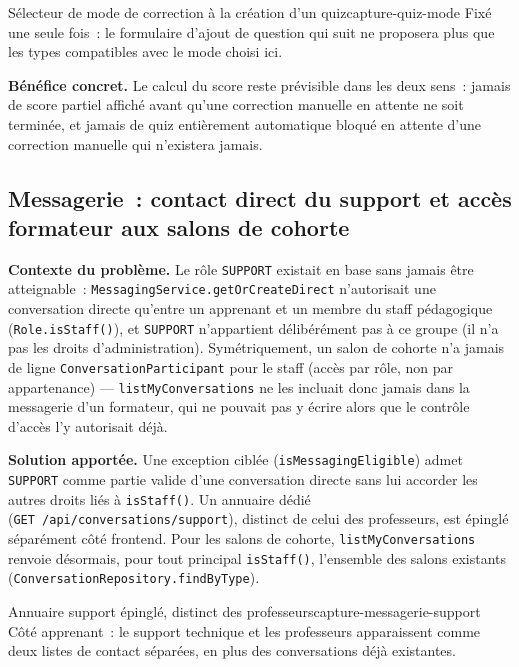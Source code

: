   {Sélecteur de mode de correction à la création d'un quiz}{capture-quiz-mode}
  {Fixé une seule fois~: le formulaire d'ajout de question qui suit ne
   proposera plus que les types compatibles avec le mode choisi ici.}

\textbf{Bénéfice concret.} Le calcul du score reste prévisible dans les
deux sens~: jamais de score partiel affiché avant qu'une correction
manuelle en attente ne soit terminée, et jamais de quiz entièrement
automatique bloqué en attente d'une correction manuelle qui n'existera
jamais.

\subsection{Messagerie~: contact direct du support et accès formateur aux salons de cohorte}
\label{sec:messagerie-support}

\textbf{Contexte du problème.} Le rôle \texttt{SUPPORT} existait en base
sans jamais être atteignable~: \texttt{MessagingService.getOrCreateDirect}
n'autorisait une conversation directe qu'entre un apprenant et un membre
du staff pédagogique (\texttt{Role.isStaff()}), et \texttt{SUPPORT}
n'appartient délibérément pas à ce groupe (il n'a pas les droits
d'administration). Symétriquement, un salon de cohorte n'a jamais de ligne
\texttt{ConversationParticipant} pour le staff (accès par rôle, non par
appartenance) --- \texttt{listMyConversations} ne les incluait donc jamais
dans la messagerie d'un formateur, qui ne pouvait pas y écrire alors que le
contrôle d'accès l'y autorisait déjà.

\textbf{Solution apportée.} Une exception ciblée
(\texttt{isMessagingEligible}) admet \texttt{SUPPORT} comme partie valide
d'une conversation directe sans lui accorder les autres droits liés à
\texttt{isStaff()}. Un annuaire dédié
(\texttt{GET~/api/conversations/support}), distinct de celui des
professeurs, est épinglé séparément côté frontend. Pour les salons de
cohorte, \texttt{listMyConversations} renvoie désormais, pour tout
principal \texttt{isStaff()}, l'ensemble des salons existants
(\texttt{ConversationRepository.findByType}).

  {Annuaire support épinglé, distinct des professeurs}{capture-messagerie-support}
  {Côté apprenant~: le support technique et les professeurs apparaissent
   comme deux listes de contact séparées, en plus des conversations déjà
   existantes.}

